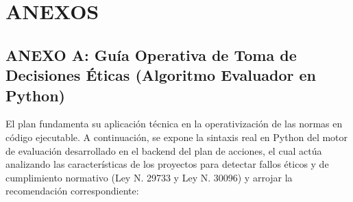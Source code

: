 \documentclass[12pt,a4paper]{article}
\begin{document}
\newpage

\section*{ANEXOS}
\thispagestyle{empty}

\subsection*{ANEXO A: Guía Operativa de Toma de Decisiones Éticas (Algoritmo Evaluador en Python)}
El plan fundamenta su aplicación técnica en la operativización de las normas en código ejecutable. A continuación, se expone la sintaxis real en Python del motor de evaluación desarrollado en el backend del plan de acciones, el cual actúa analizando las características de los proyectos para detectar fallos éticos y de cumplimiento normativo (Ley N.{\circ} 29733 y Ley N.{\circ} 30096) y arrojar la recomendación correspondiente:
\end{document}
